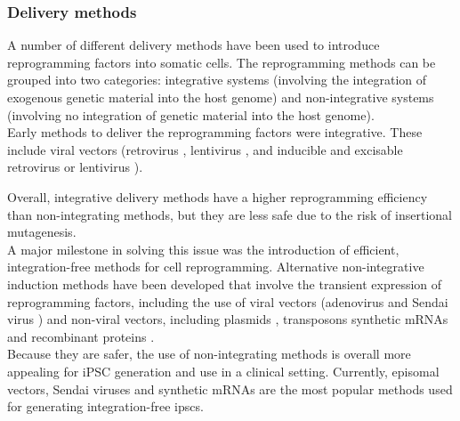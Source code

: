 \newpage

\subsubsection{Delivery methods}
\label{sec:ipsc_delivery}

A number of different delivery methods have been used to introduce reprogramming factors into somatic cells. 
The reprogramming methods can be grouped into two categories: integrative systems (involving the integration of exogenous genetic material into the host genome) and non-integrative systems (involving no integration of genetic material into the host genome). \\

Early methods to deliver the reprogramming factors were integrative.
These include viral vectors (retrovirus \cite{takahashi2006induction, takahashi2007induction, wernig2007vitro, okita2007generation, yamanaka2007strategies, maherali2007directly}, lentivirus \cite{yu2007induced, blelloch2007generation}, and 
inducible and 
excisable retrovirus \cite{soldner2009parkinson} or
lentivirus \cite{maherali2008high}). 

Overall, integrative delivery methods have a higher reprogramming efficiency than non-integrating methods, but they are less safe due to the risk of insertional mutagenesis. \\

A major milestone in solving this issue was the introduction of efficient, integration-free methods for cell reprogramming. 
Alternative non-integrative induction methods have been developed that involve the transient expression of reprogramming factors, including the use of viral vectors (adenovirus \cite{stadtfeld2008reprogramming} and Sendai virus \cite{fusaki2009efficient, nishimura2011development}) and non-viral vectors, including plasmids \cite{yu2009human, okita2008generation, okita2011more, jia2010nonviral}, transposons \cite{kaji2009virus, woltjen2009piggybac, yu2009human} synthetic mRNAs \cite{warren2010highly} and recombinant proteins \cite{kim2009generation}. \\

Because they are safer, the use of non-integrating methods is overall more appealing for iPSC generation and use in a clinical setting.
Currently, episomal vectors, Sendai viruses and synthetic mRNAs are the most popular methods used for generating integration-free \glspl{ipsc}. 


